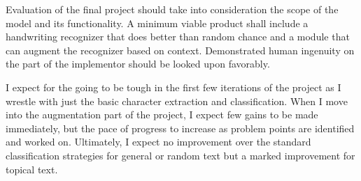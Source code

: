 \documentclass{article}
\begin{document}
Evaluation of the final project should take into consideration the scope of the model and its functionality. A minimum viable product shall include a handwriting recognizer that does better than random chance and a module that can augment the recognizer based on context. Demonstrated human ingenuity on the part of the implementor should be looked upon favorably.

I expect for the going to be tough in the first few iterations of the project as I wrestle with just the basic character extraction and classification. When I move into the augmentation part of the project, I expect few gains to be made immediately, but the pace of progress to increase as problem points are identified and worked on. Ultimately, I expect no improvement over the standard classification strategies for general or random text but a marked improvement for topical text.
\end{document}
